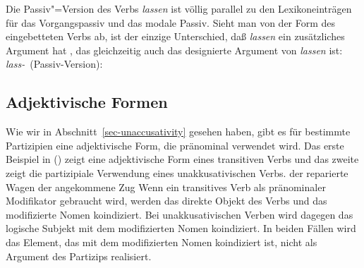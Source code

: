 {%
Die Passiv"=Version des Verbs \emph{lassen} ist völlig parallel
zu den Lexikoneinträgen für das Vorgangspassiv 
und das modale Passiv. Sieht man von der Form des eingebetteten Verbs ab, ist der
einzige Unterschied, daß \emph{lassen} ein zusätzliches Argument hat ,
das gleichzeitig auch das designierte Argument von \emph{lassen} ist:
\eas
\label{le-lassen-passive-da}
\mbox{\emph{lass-} (Passiv-Version):} \\
\ms{
 head$|$da     & \sliste{ \ibox{1} }\\[2mm]
 subcat & \sliste{ \ibox{1} NP[\type{str}] } $\oplus$ \ibox{2} $\oplus$ \liste{ V[\type{bse}, \textsc{lex}+, \textsc{da}~\sliste{ NP$_{\type{ref}}$}, \textsc{subcat}~\ibox{2}]}\\[2mm]
}
\zs




\subsection{Adjektivische Formen}
\label{sec-adj-formation}


Wie wir in Abschnitt~\ref{sec-unaccusativity} gesehen haben, gibt
es für bestimmte Partizipien eine adjektivische Form, die
pränominal verwendet wird. Das erste Beispiel in () zeigt eine
adjektivische Form eines transitiven Verbs und das zweite
zeigt die partizipiale Verwendung eines unakkusativischen Verbs.
\eal
\ex{}\label{ex-der-reparierte-wagen}
der reparierte Wagen
\ex{}\label{ex-angekommene}
der angekommene Zug
\zl
Wenn ein transitives Verb als pränominaler Modifikator gebraucht wird,
werden das direkte Objekt des Verbs und das modifizierte Nomen koindiziert.
Bei unakkusativischen Verben wird dagegen das logische Subjekt mit dem modifizierten Nomen koindiziert.
In beiden Fällen wird das Element, das mit dem modifizierten Nomen koindiziert ist,
nicht als Argument des Partizips realisiert.

}
